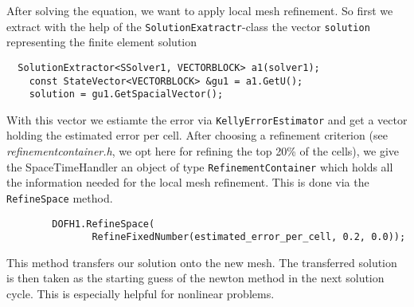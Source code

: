 After solving the equation, we want to apply local mesh refinement. So first we extract with the help of the \texttt{SolutionExatractr}-class the vector \texttt{solution} representing the finite element solution
\begin{verbatim}
  SolutionExtractor<SSolver1, VECTORBLOCK> a1(solver1);
 	const StateVector<VECTORBLOCK> &gu1 = a1.GetU();
 	solution = gu1.GetSpacialVector();
\end{verbatim}
With this vector we estiamte the error via \texttt{KellyErrorEstimator} and get a vector holding the estimated error per cell. After choosing a refinement criterion (see \textit{refinementcontainer.h}, we opt here for refining the top 20\% of the cells), we give the SpaceTimeHandler an object of type \texttt{RefinementContainer} which holds all the information needed for the local mesh refinement. This is done via the \texttt{RefineSpace} method.
\begin{verbatim}
        DOFH1.RefineSpace(
               RefineFixedNumber(estimated_error_per_cell, 0.2, 0.0));
\end{verbatim}
This method transfers our solution onto the new mesh. The transferred solution is then taken as the starting guess of the newton method in the next solution cycle. This is especially helpful for nonlinear problems.
